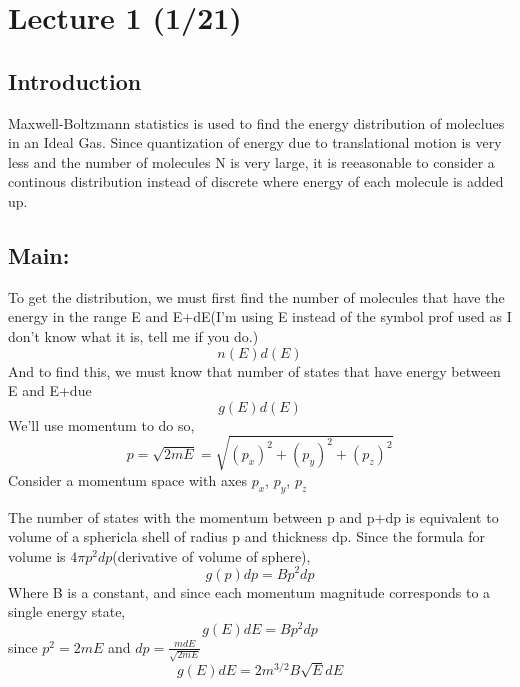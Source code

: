 
\section[Lecture 1 (Date) -- {\it Molecular Energies in an Ideal Gas}]{Lecture 1 (1/21)}

\subsection{Introduction}
Maxwell-Boltzmann statistics is used to find the energy distribution of moleclues in an Ideal Gas.
Since quantization of energy due to translational motion is very less and the number of molecules N is 
very large, it is reeasonable to consider a continous distribution instead of discrete where energy of each 
molecule is added up.

\subsection{Main:}
To get the distribution, we must first find the number of molecules that have the energy in the range E and E+dE(I'm using E instead of the symbol prof used as I don't know what it is, tell me if you do.)
$$n(E)d(E)$$
And to find this, we must know that number of states that have energy between E and E+due
$$g(E)d(E)$$
We'll use momentum to do so, 
$$p=\sqrt{2mE}=\sqrt{(p_{x})^2+(p_{y})^2+(p_{z})^2}$$
Consider a momentum space with axes $p_{x}$, $p_{y}$, $p_{z}$

The number of states with the momentum between p and p+dp is equivalent to volume of a sphericla shell of radius p and thickness dp.
Since the formula for volume is $4{\pi}p^2dp$(derivative of volume of sphere), 
$$g(p)dp=Bp^2dp$$
Where B is a constant, and since each momentum magnitude corresponds to a single energy state, 
$$g(E)dE=Bp^2dp$$
since $p^2=2mE$ and $dp=\frac{mdE}{\sqrt{2mE}}$
$$g(E)d{E}=2m^{3/2}B\sqrt{E}dE$$
